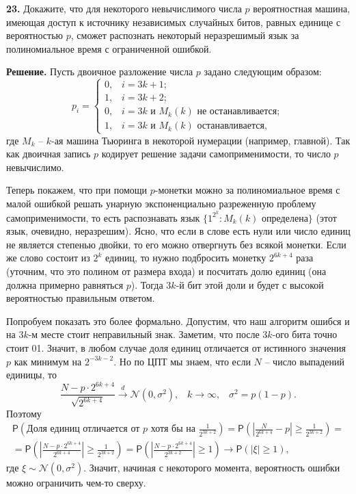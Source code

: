 \textbf{23.} Докажите, что для некоторого невычислимого числа $p$ вероятностная машина, имеющая доступ к источнику независимых случайных битов, равных единице с вероятностью $p$, сможет распознать некоторый неразрешимый язык за полиномиальное время с ограниченной ошибкой.

\textbf{Решение.} Пусть двоичное разложение числа $p$ задано следующим образом:
\[
p_i = \begin{cases}
0, \;\;\;i=3k+1;\\
1, \;\;\;i=3k+2;\\
0, \;\;\;\text{$i=3k$ и $M_k(k)$ не останавливается};\\
1, \;\;\;\text{$i=3k$ и $M_k(k)$ останавливается},
\end{cases}
\]
где $M_k$ -- $k$-ая машина Тьюринга в некоторой нумерации (например, главной). Так как двоичная запись $p$ кодирует решение задачи самоприменимости, то число $p$ невычислимо.

Теперь покажем, что при помощи $p$-монетки можно за полиномиальное время с малой ошибкой решать унарную экспоненциально разреженную проблему самоприменимости, то есть распознавать язык $\{1^{2^k}\colon M_k(k) \text{ определена}\}$ (этот язык, очевидно, неразрешим). Ясно, что если в слове есть нули или число единиц не является степенью двойки, то его можно отвергнуть без всякой монетки. Если же слово состоит из $2^k$ единиц, то нужно подбросить монетку $2^{6k+4}$ раза (уточним, что это полином от размера входа) и посчитать долю единиц (она должна примерно равняться $p$). Тогда $3k$-й бит этой доли и будет с высокой вероятностью правильным ответом.

Попробуем показать это более формально. Допустим, что наш алгоритм ошибся и на $3k$-м месте стоит неправильный знак. Заметим, что после $3k$-ого бита точно стоит 01. Значит, в любом случае доля единиц отличается от истинного значения $p$ как минимум на $2^{-3k-2}$. Но по ЦПТ мы знаем, что если $N$ -- число выпадений единицы, то
\[
\frac{N - p\cdot2^{6k+4}}{\sqrt{2^{6k+4}}} \stackrel{d}{\longrightarrow} \mathcal{N}(0, \sigma^2),\;\;\;k\to\infty,\;\;\;\sigma^2 = p(1-p).
\]
Поэтому
\begin{gather*}
    \mathsf{P}\left(\text{Доля единиц отличается от $p$ хотя бы на $\frac{1}{2^{3k+2}}$}\right) = \mathsf{P}\left(\left|\frac{N}{2^{6k+4}} - p\right| \ge \frac{1}{2^{3k+2}}\right) =\\
    = \mathsf{P}\left(\left|\frac{N - p\cdot2^{6k+4}}{2^{6k+4}}\right| \ge \frac{1}{2^{3k+2}}\right) = \mathsf{P}\left(\left|\frac{N - p\cdot2^{6k+4}}{2^{3k+2}}\right| \ge 1\right) \to \mathsf{P}(|\xi| \ge 1),
\end{gather*}
где $\xi \sim \mathcal{N}(0, \sigma^2)$. Значит, начиная с некоторого момента, вероятность ошибки можно ограничить чем-то сверху.